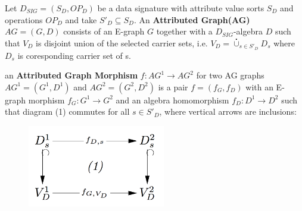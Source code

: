 \begin{ProposalDef}
Let $D_{SIG} = (S_D,OP_D)$ be a data signature with attribute value sorts $S_D$ and operations $OP_D$ and take $S'_D \subseteq S_D$. An \textbf{Attributed Graph(AG)} $AG = (G,D)$ consists of an E-graph $G$ together with a $D_{SIG}$-algebra $D$ such that $V_D$ is disjoint union of the selected carrier sets, i.e. $V_D=\overset{\centerdot}{\cup}_{s \in S'_D} D_s$ where $D_s$ is coresponding carrier set of s.
\end{ProposalDef}

\begin{ProposalDef}
an \textbf{Attributed Graph Morphism}  $f : AG^1 \rightarrow AG^2$ for two AG graphs $AG^1=(G^1,D^1)$ and $AG^2 = (G^2,D^2)$ is a pair $f=(f_G,f_D)$ with an E-graph morphism $f_G : G^1 \rightarrow G^2$ and an algebra homomorphism $f_D : D^1 \rightarrow D^2$ such that diagram (1) commutes for all $s \in S'_D$, where vertical arrows are inclusions:

\begin{figure}[ht!]
\centering
\includegraphics[width=60mm]{images/AGmorphism.png}
\label{AG morphism}
\end{figure}

\end{ProposalDef}

